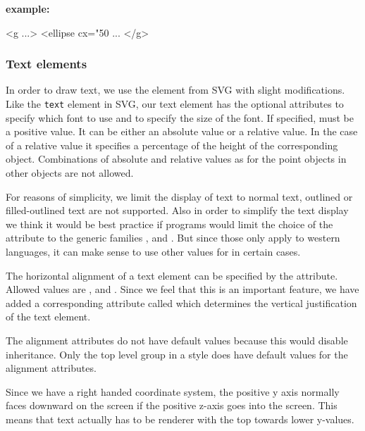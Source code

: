 {\large
{\bf
example:
}
}

{\footnotesize
\begin{example}
 <g ...>
  <ellipse cx="50%
      ...
</g> 
\end{example}
}

\subsubsection{Text elements}
\label{text-class}
In order to draw text, we use the  element from SVG with slight 
modifications. Like the \texttt{text} element in SVG, our text element has the 
optional attributes  to specify  which font to use and 
 to specify the size of the font.  
If specified,  must be a positive value. It can be either an absolute
value or a relative value. In the case of a relative value it specifies a percentage of the
height of the corresponding object. Combinations of absolute and relative values as for the 
point objects in other objects are not allowed.

For reasons of simplicity, we limit the display of text to normal text, 
outlined or filled-outlined text are not supported. Also in order to simplify the
text display we think it would be best practice if programs would limit the 
choice of the  attribute to the generic families , 
and . But since those only apply to western languages, it can make
sense to use other values for  in certain cases.

The horizontal alignment of a text element can be specified by the 
 attribute. Allowed values are ,  and .  Since we feel that this is an important feature, we
have added a corresponding attribute called  which determines the vertical justification of the
text element. 

The alignment attributes do not have default values because this would disable inheritance. Only the top level group in a style does have default values for the alignment attributes.

Since we have a right handed coordinate system, the positive y axis normally faces downward on the screen if the positive
z-axis goes into the screen. This means that text actually has to be renderer with the top towards lower y-values.

